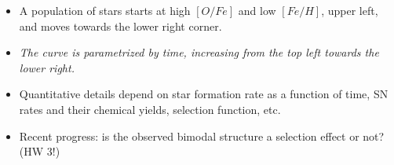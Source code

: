 \documentclass[letterpaper,landscape]{slides}
\begin{document}
\begin{slide}
{\begin{minipage}[t]{12cm}
\begin{itemize}
\item A population of stars starts at high $[O/Fe]$ and low  $[Fe/H]$, upper left, and
moves towards the lower right corner.
\item {\it The curve is parametrized by time, increasing from the top left towards the lower
right.}
\item Quantitative details depend on star formation rate as a function of time, SN rates and
their chemical yields, selection function, etc. 
\item Recent progress: is the observed bimodal structure a selection effect or not? (HW 3!) 

\end{itemize}     

\end{minipage}}
\vfill 
\end{slide}
\end{document}
